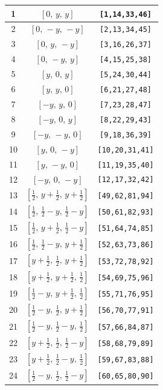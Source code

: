 \documentclass[fleqn,8pt]{jsarticle}
\begin{document}
\begin{longtable}{ccc}
1 & $\left[ 0,\, y,\, y \right]$ & {\tt [1,14,33,46]} \\ \hline
2 & $\left[ 0,\, - y,\, - y \right]$ & {\tt [2,13,34,45]} \\ \hline
3 & $\left[ 0,\, y,\, - y \right]$ & {\tt [3,16,26,37]} \\ \hline
4 & $\left[ 0,\, - y,\, y \right]$ & {\tt [4,15,25,38]} \\ \hline
5 & $\left[ y,\, 0,\, y \right]$ & {\tt [5,24,30,44]} \\ \hline
6 & $\left[ y,\, y,\, 0 \right]$ & {\tt [6,21,27,48]} \\ \hline
7 & $\left[ - y,\, y,\, 0 \right]$ & {\tt [7,23,28,47]} \\ \hline
8 & $\left[ - y,\, 0,\, y \right]$ & {\tt [8,22,29,43]} \\ \hline
9 & $\left[ - y,\, - y,\, 0 \right]$ & {\tt [9,18,36,39]} \\ \hline
10 & $\left[ y,\, 0,\, - y \right]$ & {\tt [10,20,31,41]} \\ \hline
11 & $\left[ y,\, - y,\, 0 \right]$ & {\tt [11,19,35,40]} \\ \hline
12 & $\left[ - y,\, 0,\, - y \right]$ & {\tt [12,17,32,42]} \\ \hline
13 & $\left[ \frac{1}{2},\, y + \frac{1}{2},\, y + \frac{1}{2} \right]$ & {\tt [49,62,81,94]} \\ \hline
14 & $\left[ \frac{1}{2},\, \frac{1}{2} - y,\, \frac{1}{2} - y \right]$ & {\tt [50,61,82,93]} \\ \hline
15 & $\left[ \frac{1}{2},\, y + \frac{1}{2},\, \frac{1}{2} - y \right]$ & {\tt [51,64,74,85]} \\ \hline
16 & $\left[ \frac{1}{2},\, \frac{1}{2} - y,\, y + \frac{1}{2} \right]$ & {\tt [52,63,73,86]} \\ \hline
17 & $\left[ y + \frac{1}{2},\, \frac{1}{2},\, y + \frac{1}{2} \right]$ & {\tt [53,72,78,92]} \\ \hline
18 & $\left[ y + \frac{1}{2},\, y + \frac{1}{2},\, \frac{1}{2} \right]$ & {\tt [54,69,75,96]} \\ \hline
19 & $\left[ \frac{1}{2} - y,\, y + \frac{1}{2},\, \frac{1}{2} \right]$ & {\tt [55,71,76,95]} \\ \hline
20 & $\left[ \frac{1}{2} - y,\, \frac{1}{2},\, y + \frac{1}{2} \right]$ & {\tt [56,70,77,91]} \\ \hline
21 & $\left[ \frac{1}{2} - y,\, \frac{1}{2} - y,\, \frac{1}{2} \right]$ & {\tt [57,66,84,87]} \\ \hline
22 & $\left[ y + \frac{1}{2},\, \frac{1}{2},\, \frac{1}{2} - y \right]$ & {\tt [58,68,79,89]} \\ \hline
23 & $\left[ y + \frac{1}{2},\, \frac{1}{2} - y,\, \frac{1}{2} \right]$ & {\tt [59,67,83,88]} \\ \hline
24 & $\left[ \frac{1}{2} - y,\, \frac{1}{2},\, \frac{1}{2} - y \right]$ & {\tt [60,65,80,90]} \\
\end{longtable}
\end{document}
